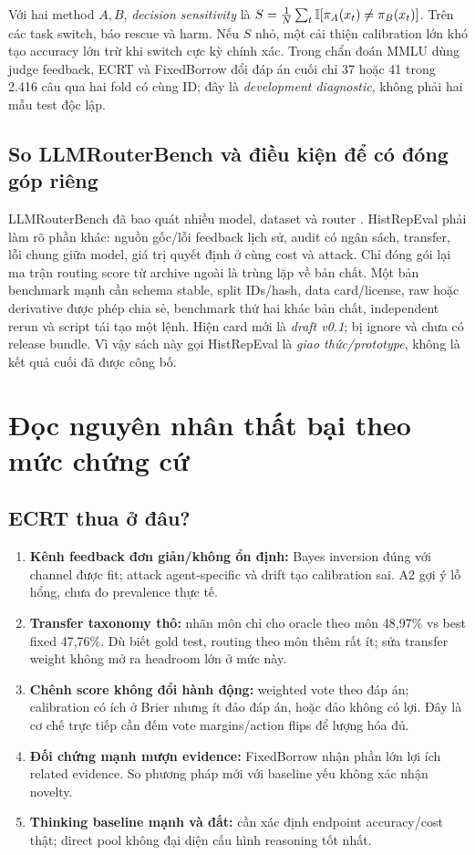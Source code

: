 \documentclass[11pt,a4paper,openany]{book}
\newcommand{\repo}[1]{\path{#1}}
\begin{document}
Với hai method \(A,B\), \emph{decision sensitivity} là \(S=\frac1N\sum_t\mathbb I[\pi_A(x_t)\ne\pi_B(x_t)]\). Trên các task switch, báo rescue và harm. Nếu \(S\) nhỏ, một cải thiện calibration lớn khó tạo accuracy lớn trừ khi switch cực kỳ chính xác. Trong chẩn đoán MMLU dùng judge feedback, ECRT và FixedBorrow đổi đáp án cuối chỉ 37 hoặc 41 trong 2.416 câu qua hai fold có cùng ID; đây là \emph{development diagnostic}, không phải hai mẫu test độc lập.

\section{So LLMRouterBench và điều kiện để có đóng góp riêng}
LLMRouterBench đã bao quát nhiều model, dataset và router \cite{llmrouterbench}. HistRepEval phải làm rõ phần khác: nguồn gốc/lỗi feedback lịch sử, audit có ngân sách, transfer, lỗi chung giữa model, giá trị quyết định ở cùng cost và attack. Chỉ đóng gói lại ma trận routing score từ archive ngoài là trùng lặp về bản chất. Một bản benchmark mạnh cần schema stable, split IDs/hash, data card/license, raw hoặc derivative được phép chia sẻ, benchmark thứ hai khác bản chất, independent rerun và script tái tạo một lệnh. Hiện card mới là \emph{draft v0.1}; \repo{results/} bị ignore và chưa có release bundle. Vì vậy sách này gọi HistRepEval là \emph{giao thức/prototype}, không là kết quả cuối đã được công bố.

\chapter{Đọc nguyên nhân thất bại theo mức chứng cứ}
\section{ECRT thua ở đâu?}
\begin{enumerate}
\item \textbf{Kênh feedback đơn giản/không ổn định:} Bayes inversion đúng với channel được fit; attack agent-specific và drift tạo calibration sai. A2 gợi ý lỗ hổng, chưa đo prevalence thực tế.
\item \textbf{Transfer taxonomy thô:} nhãn môn chỉ cho oracle theo môn 48,97\% vs best fixed 47,76\%. Dù biết gold test, routing theo môn thêm rất ít; sửa transfer weight không mở ra headroom lớn ở mức này.
\item \textbf{Chênh score không đổi hành động:} weighted vote theo đáp án; calibration có ích ở Brier nhưng ít đảo đáp án, hoặc đảo không có lợi. Đây là cơ chế trực tiếp cần đếm vote margins/action flips để lượng hóa đủ.
\item \textbf{Đối chứng mạnh mượn evidence:} FixedBorrow nhận phần lớn lợi ích related evidence. So phương pháp mới với baseline yếu không xác nhận novelty.
\item \textbf{Thinking baseline mạnh và đắt:} cần xác định endpoint accuracy/cost thật; direct pool không đại diện cấu hình reasoning tốt nhất.
\end{enumerate}
\end{document}
